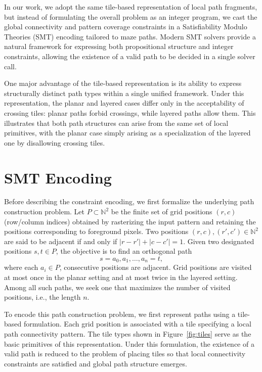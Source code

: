 \documentclass[letterpaper,11pt]{article}
\begin{document}
In our work, we adopt the same tile-based representation of local path
fragments, but instead of formulating the overall problem as an
integer program, we cast the global connectivity and pattern coverage
constraints in a Satisfiability Modulo Theories (SMT) encoding
tailored to maze paths. Modern SMT solvers provide a natural framework
for expressing both propositional structure and integer constraints,
allowing the existence of a valid path to be decided in a single
solver call.

One major advantage of the tile-based representation is its ability to
express structurally distinct path types within a single unified
framework. Under this representation, the planar and layered cases
differ only in the acceptability of crossing tiles: planar paths
forbid crossings, while layered paths allow them. This illustrates
that both path structures can arise from the same set of local
primitives, with the planar case simply arising as a specialization of
the layered one by disallowing crossing tiles.

\section*{SMT Encoding}

Before describing the constraint encoding, we first formalize the
underlying path construction problem. Let \(P \subset \mathbb{N}^2\)
be the finite set of grid positions \((r,c)\) (row/column indices)
obtained by rasterizing the input pattern and retaining the positions
corresponding to foreground pixels. Two positions \((r,c),(r',c') \in
\mathbb{N}^2\) are said to be adjacent if and only if
\(|r-r'|+|c-c'|=1\). Given two designated positions \(s,t \in P\), the
objective is to find an orthogonal path
\[
s = a_0, a_1, \ldots, a_n = t,
\]
where each \(a_i \in P\), consecutive positions are adjacent. Grid
positions are visited at most once in the planar setting and at most
twice in the layered setting. Among all such paths, we seek one that
maximizes the number of visited positions, i.e., the length \(n\).

To encode this path construction problem, we first represent paths
using a tile-based formulation. Each grid position is associated with
a tile specifying a local path connectivity pattern. The tile types
shown in Figure~\ref{fig:tiles} serve as the basic primitives of this
representation. Under this formulation, the existence of a valid path
is reduced to the problem of placing tiles so that local connectivity
constraints are satisfied and global path structure emerges.
\end{document}
